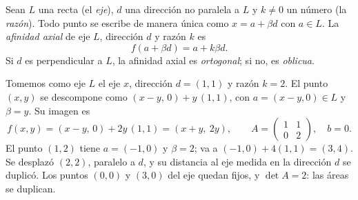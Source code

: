 \begin{definicion}\label{def:06-axial}
Sean \(L\) una recta (el \emph{eje}), \(d\) una dirección no paralela a \(L\) y \(k\neq0\) un
número (la \emph{razón}). Todo punto se escribe de manera única como \(x=a+\beta d\) con
\(a\in L\). La \emph{afinidad axial} de eje \(L\), dirección \(d\) y razón \(k\) es
\[
  f(a+\beta d)=a+k\beta d .
\]
Si \(d\) es perpendicular a \(L\), la afinidad axial es \emph{ortogonal}; si no, es
\emph{oblicua}.
\end{definicion}

\begin{ejemplo}\label{ej:06-axial}
Tomemos como eje \(L\) el eje \(x\), dirección \(d=(1,1)\) y razón \(k=2\). El punto
\((x,y)\) se descompone como \((x-y,\,0)+y\,(1,1)\), con \(a=(x-y,0)\in L\) y \(\beta=y\). Su
imagen es
\[
  f(x,y)=(x-y,\,0)+2y\,(1,1)=(x+y,\ 2y),
  \qquad
  A=\begin{pmatrix}1&1\\0&2\end{pmatrix},\quad b=0 .
\]
El punto \((1,2)\) tiene \(a=(-1,0)\) y \(\beta=2\); va a \((-1,0)+4(1,1)=(3,4)\). Se desplazó
\((2,2)\), paralelo a \(d\), y su distancia al eje medida en la dirección \(d\) se duplicó. Los
puntos \((0,0)\) y \((3,0)\) del eje quedan fijos, y \(\det A=2\): las áreas se duplican.
\end{ejemplo}

\begin{center}
\end{center}

